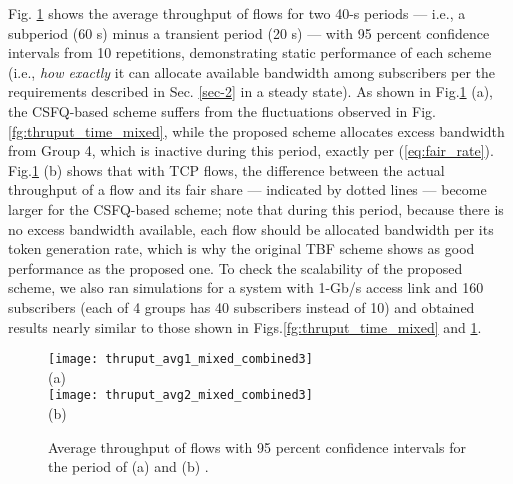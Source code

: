\documentclass[conference,twoside,final]{IEEEtran}
\begin{document}
Fig. \ref{fg:thruput_avg} shows the average throughput of flows for two 40-s
periods --- i.e., a subperiod (60 s) minus a transient period (20 s) --- with 95
percent confidence intervals from 10 repetitions, demonstrating static
performance of each scheme (i.e., \emph{how exactly} it can allocate available
bandwidth among subscribers per the requirements described in
Sec. \ref{sec-2} in a steady state). As shown in
Fig.\ref{fg:thruput_avg} (a), the CSFQ-based scheme suffers from the
fluctuations observed in Fig.\ref{fg:thruput_time_mixed}, while the
proposed scheme allocates excess bandwidth from Group 4, which is inactive
during this period, exactly per
(\ref{eq:fair_rate}). Fig.\ref{fg:thruput_avg} (b) shows that with TCP
flows, the difference between the actual throughput of a flow and its fair share
--- indicated by dotted lines --- become larger for the CSFQ-based scheme; note
that during this period, because there is no excess bandwidth available, each
flow should be allocated bandwidth per its token generation rate, which is why
the original TBF scheme shows as good performance as the proposed one. To check
the scalability of the proposed scheme, we also ran simulations for a system
with 1-Gb/s access link and 160 subscribers (each of 4 groups has 40 subscribers
instead of 10) and obtained results nearly similar to those shown in
Figs.\ref{fg:thruput_time_mixed} and \ref{fg:thruput_avg}.
\begin{figure}[!htb]
    \begin{center}
        \texttt{[image: thruput\_avg1\_mixed\_combined3]}\\
        {\scriptsize (a)}\\
        \texttt{[image: thruput\_avg2\_mixed\_combined3]}\\
        {\scriptsize (b)}
    \end{center}
    \caption{Average throughput of flows with 95 percent confidence intervals
        for the period of (a)  and (b) .}
    \label{fg:thruput_avg}
\end{figure}
\end{document}
